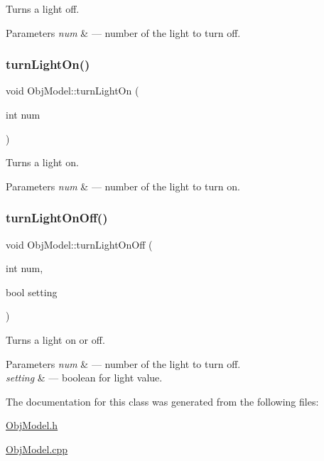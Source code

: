 Turns a light off. 


\begin{DoxyParams}{Parameters}
{\em num} & --- number of the light to turn off. \\
\hline
\end{DoxyParams}
\mbox{\label{class_obj_model_a14bb9c395cd453db4be2a8fdfeb57ae8}} 
\subsubsection{\texorpdfstring{turn\+Light\+On()}{turnLightOn()}}
{\footnotesize\ttfamily void Obj\+Model\+::turn\+Light\+On (\begin{DoxyParamCaption}\item[{int}]{num }\end{DoxyParamCaption})}



Turns a light on. 


\begin{DoxyParams}{Parameters}
{\em num} & --- number of the light to turn on. \\
\hline
\end{DoxyParams}
\mbox{\label{class_obj_model_a17a3c9348453c872b3d90c880a49098d}} 
\subsubsection{\texorpdfstring{turn\+Light\+On\+Off()}{turnLightOnOff()}}
{\footnotesize\ttfamily void Obj\+Model\+::turn\+Light\+On\+Off (\begin{DoxyParamCaption}\item[{int}]{num,  }\item[{bool}]{setting }\end{DoxyParamCaption})}



Turns a light on or off. 


\begin{DoxyParams}{Parameters}
{\em num} & --- number of the light to turn off.\\
\hline
{\em setting} & --- boolean for light value. \\
\hline
\end{DoxyParams}


The documentation for this class was generated from the following files\+:\begin{DoxyCompactItemize}
\item 
\hyperlink{_obj_model_8h}{Obj\+Model.\+h}\item 
\hyperlink{_obj_model_8cpp}{Obj\+Model.\+cpp}\end{DoxyCompactItemize}
